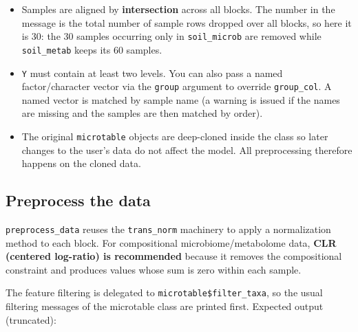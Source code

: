 \documentclass[
]{book}
\newenvironment{Shaded}{\begin{snugshade}}{\end{snugshade}}
\newcommand{\AttributeTok}[1]{\textcolor[rgb]{0.13,0.29,0.53}{#1}}
\newcommand{\CommentTok}[1]{\textcolor[rgb]{0.56,0.35,0.01}{\textit{#1}}}
\newcommand{\DecValTok}[1]{\textcolor[rgb]{0.00,0.00,0.81}{#1}}
\newcommand{\FloatTok}[1]{\textcolor[rgb]{0.00,0.00,0.81}{#1}}
\newcommand{\FunctionTok}[1]{\textcolor[rgb]{0.13,0.29,0.53}{\textbf{#1}}}
\newcommand{\NormalTok}[1]{#1}
\newcommand{\SpecialCharTok}[1]{\textcolor[rgb]{0.81,0.36,0.00}{\textbf{#1}}}
\newcommand{\StringTok}[1]{\textcolor[rgb]{0.31,0.60,0.02}{#1}}
\providecommand{\tightlist}{%
  \setlength{\itemsep}{0pt}\setlength{\parskip}{0pt}}
\begin{document}
\begin{itemize}
\tightlist
\item
  Samples are aligned by \textbf{intersection} across all blocks.
  The number in the message is the total number of sample rows dropped over all blocks, so here it is 30: the 30 samples occurring only in \texttt{soil\_microb} are removed while \texttt{soil\_metab} keeps its 60 samples.
\item
  \texttt{Y} must contain at least two levels.
  You can also pass a named factor/character vector via the \texttt{group} argument to override \texttt{group\_col}.
  A named vector is matched by sample name (a warning is issued if the names are missing and the samples are then matched by order).
\item
  The original \texttt{microtable} objects are deep-cloned inside the class so later changes to the user's data do not affect the model.
  All preprocessing therefore happens on the cloned data.
\end{itemize}

\subsection{Preprocess the data}\label{preprocess-the-data}

\texttt{preprocess\_data} reuses the \texttt{trans\_norm} machinery to apply a normalization method to each block.
For compositional microbiome/metabolome data, \textbf{CLR (centered log-ratio) is recommended} because it removes the compositional constraint and produces values whose sum is zero within each sample.

\begin{Shaded}
\end{Shaded}

The feature filtering is delegated to \texttt{microtable\$filter\_taxa}, so the usual filtering messages of the microtable class are printed first.
Expected output (truncated):
\end{document}
